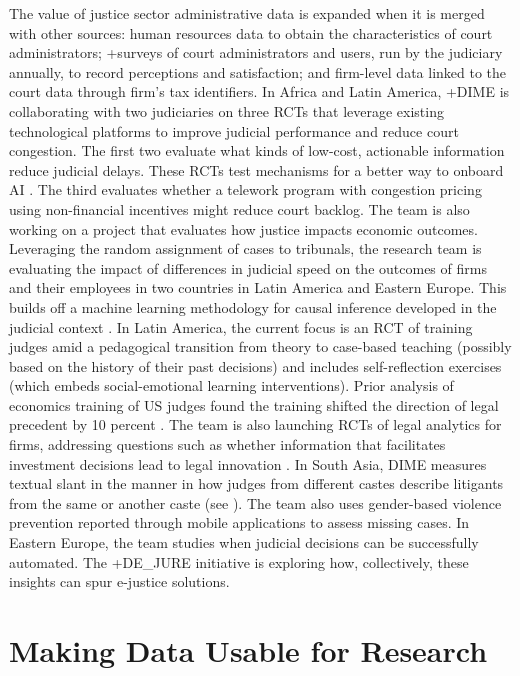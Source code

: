 \documentclass[
]{book}
\begin{document}
The value of justice sector administrative data is expanded when it is merged with other sources: human resources data to obtain the characteristics of court administrators; +surveys\textbar{} of court administrators and users, run by the judiciary annually, to record perceptions and satisfaction; and firm-level data linked to the court data through firm's tax identifiers. In Africa and Latin America, +DIME\textbar{} is collaborating with two judiciaries on three RCTs that leverage existing technological platforms to improve judicial performance and reduce court congestion. The first two evaluate what kinds of low-cost, actionable information reduce judicial delays. These RCTs test mechanisms for a better way to onboard AI \citep[see][]{babic2020}. The third evaluates whether a telework program with congestion pricing using non-financial incentives might reduce court backlog. The team is also working on a project that evaluates how justice impacts economic outcomes. Leveraging the random assignment of cases to tribunals, the research team is evaluating the impact of differences in judicial speed on the outcomes of firms and their employees in two countries in Latin America and Eastern Europe. This builds off a machine learning methodology for causal inference developed in the judicial context \citep[see][]{babic2020}. In Latin America, the current focus is an RCT of training judges amid a pedagogical transition from theory to case-based teaching (possibly based on the history of their past decisions) and includes self-reflection exercises (which embeds social-emotional learning interventions). Prior analysis of economics training of US judges found the training shifted the direction of legal precedent by 10 percent \citep{galletta2019}. The team is also launching RCTs of legal analytics for firms, addressing questions such as whether information that facilitates investment decisions lead to legal innovation \citep{chen2015}. In South Asia, DIME measures textual slant in the manner in how judges from different castes describe litigants from the same or another caste (see \citet{ash2019}). The team also uses gender-based violence prevention reported through mobile applications to assess missing cases. In Eastern Europe, the team studies when judicial decisions can be successfully automated. The +DE\_JURE\textbar{} initiative is exploring how, collectively, these insights can spur e-justice solutions.

\hypertarget{making-data-usable-for-research-6}{%
\section{Making Data Usable for Research}\label{making-data-usable-for-research-6}}
\end{document}
